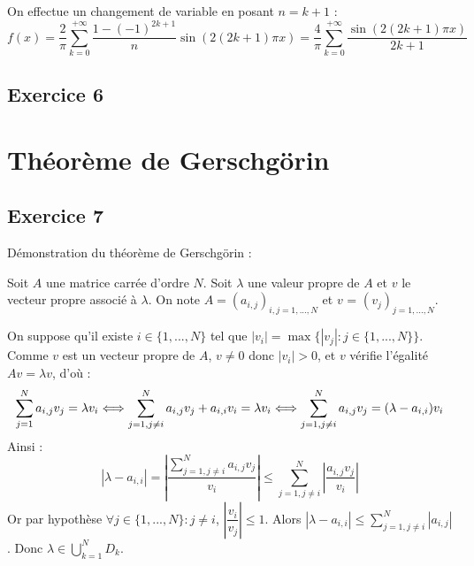\documentclass[a4paper,11pt]{article}
\begin{document}
	On effectue un changement de variable en posant $n=k+1$ :
	\begin{equation*}
		f(x) =  \frac{2}{\pi} \sum_{k=0}^{+ \infty} \frac{1-(-1)^{2k+1}}{n} \sin (2 (2k+1) \pi x)
		= \frac{4}{\pi} \sum_{k=0}^{+ \infty} \frac{\sin (2 (2k+1) \pi x)}{2k+1}
	\end{equation*}

\subsection*{Exercice 6}

\section{Théorème de Gerschgörin}

\subsection*{Exercice 7}

	Démonstration du théorème de Gerschgörin :

	Soit $A$ une matrice carrée d'ordre $N$. Soit $\lambda$ une valeur propre de $A$ et $v$ le vecteur propre associé à $\lambda$. On note $A = (a_{i,j})_{i,j=1,...,N}$ et $v$ = $(v_{j})_{j=1,...,N}$.

	On suppose qu'il existe $i \in \{1, ..., N\}$ tel que $|v_{i}| = \max \{ |v_{j}| : j \in \{1, ..., N\}\}$. Comme $v$ est un vecteur propre de $A$, $v \neq 0$ donc $|v_{i}| > 0$, et $v$ vérifie l'égalité $Av = \lambda v$, d'où :
	\begin{equation*}
		\sum_{j = 1}^{N} a_{i, j} v_{j} = \lambda v_{i}
		\Longleftrightarrow \sum_{j = 1, j \neq i}^{N} a_{i, j} v_{j} + a_{i, i} v_{i}= \lambda v_{i} \\
		\Longleftrightarrow \sum_{j = 1, j \neq i}^{N} a_{i, j} v_{j} = (\lambda - a_{i, i}) v_{i}
	\end{equation*}
	Ainsi :
	\begin{equation*}
		|\lambda - a_{i, i}| = \left|\frac{\sum\limits_{j = 1, j \neq i}^{N} a_{i, j} v_{j}}{v_{i}} \right|
		\leqslant \sum_{j = 1, j \neq i}^{N} \left|\frac{a_{i, j} v_{j}}{v_{i}} \right|
	\end{equation*}
	Or par hypothèse $\forall j \in \{1, ..., N\} : j \neq i$, $\left|\dfrac{v_{i}}{v_{j}}\right| \leqslant 1$.
	Alors $|\lambda - a_{i, i}| \leqslant \sum\limits_{j = 1, j \neq i}^{N} |a_{i, j}|$. \newline
	Donc $\lambda \in \bigcup\limits_{k=1}^{N} D_{k}$.
\end{document}
